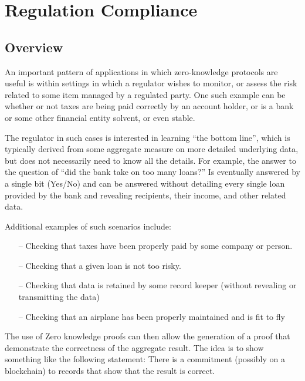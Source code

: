 \section{Regulation Compliance}
\label{apps:regulation-compliance}


\subsection{Overview}
\label{apps:regulation-compliance:overview}

An important pattern of applications in which zero-knowledge protocols are useful is within settings in which a regulator wishes to monitor, or assess the risk related to some item managed by a regulated party. One such example can be whether or not taxes are being paid correctly by an account holder, or is a bank or some other financial entity solvent, or even stable. 

The regulator in such cases is interested in learning “the bottom line”, which is typically derived from some aggregate measure on more detailed underlying data, but does not necessarily need to know all the details. For example, the answer to the question of “did the bank take on too many loans?” Is eventually answered by a single bit (Yes/No) and can be answered without detailing every single loan provided by the bank and revealing recipients, their income, and other related data. 

Additional examples of such scenarios include: 
\begin{itemize}
    \item[--] Checking that taxes have been properly paid by some company or person.
    \item[--] Checking that a given loan is not too risky.
    \item[--] Checking that data is retained by some record keeper (without revealing or transmitting the data)
    \item[--] Checking that an airplane has been properly maintained and is fit to fly 
\end{itemize}

The use of Zero knowledge proofs can then allow the generation of a proof that demonstrate the correctness of the aggregate result. The idea is to show something like the following statement: There is a commitment (possibly on a blockchain) to records that show that the result is correct. 

